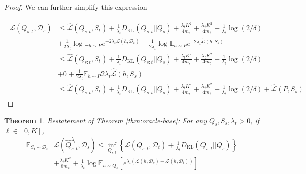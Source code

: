 \documentclass{article}
\theoremstyle{plain}
\newtheorem{theorem}{Theorem}[section]
\theoremstyle{definition}
\theoremstyle{remark}
\begin{document}
\begin{proof}
We can further simplify this expression 

\begin{align*}
\begin{split}
\mathcal{L}(Q_{s:t}, \mathcal{D}_s) &\leq \hat{\mathcal{L}}(Q_{s:t}, S_t)+ \frac{1}{\lambda_t} D_{\mathrm{KL}}(Q_{s:t}||Q_{s})
+\frac{\lambda_t K^2}{4m_s}+\frac{\lambda_t K^2}{4m_t}+\frac{1}{\lambda_t}\log(2/\delta)\\&+\frac{1}{2\lambda_t}\log\mathbb{E}_{h\sim P} e^{-2\lambda_t\mathcal{L}(h,\mathcal{D}_t)}-\frac{1}{2\lambda_t}\log\mathbb{E}_{h\sim P} e^{-2\lambda_t\hat{\mathcal{L}}(h,S_s)}   \\
& \leq \hat{\mathcal{L}}(Q_{s:t}, S_t)+ \frac{1}{\lambda_t} D_{\mathrm{KL}}(Q_{s:t}||Q_{s})
+\frac{\lambda_t K^2}{4m_s}+\frac{\lambda_t K^2}{4m_t}+\frac{1}{\lambda_t}\log(2/\delta)\\&+0+\frac{1}{2\lambda_t}\mathbb{E}_{h\sim P} 2\lambda_t\hat{\mathcal{L}}(h,S_s) \\
& \leq \hat{\mathcal{L}}(Q_{s:t}, S_t) + \frac{1}{\lambda_t} D_{\mathrm{KL}}(Q_{s:t}||Q_{s})
+\frac{\lambda_t K^2}{4m_s}+\frac{\lambda_t K^2}{4m_t}+\frac{1}{\lambda_t}\log(2/\delta)+ \hat{\mathcal{L}}(P, S_s)
\end{split}
\end{align*}

\end{proof}



\begin{theorem} Restatement of Theorem \ref{thm:oracle-base}:
For any $Q_s, S_s, \lambda_t>0$, if $\ell\in [0,K]$, 
\begin{equation} 
\begin{split}
\mathbb{E}_{S_t\sim \mathcal{D}_t}&\mathcal{L}( \hat{Q}^{\lambda_t}_{s:t},\mathcal{D}_s)\leq\inf_{Q_{s:t}}\left \{ \mathcal{L}(Q_{s:t},\mathcal{D}_t) + \frac{1}{\lambda_t}D_{\mathrm{KL}}(Q_{s:t}||Q_{s}) \right \} \\
&+\frac{\lambda_t K^2}{8m_t}+\frac{1}{\lambda_t}\log\mathbb{E}_{h\sim Q_s}\left [e^{\lambda_t(\mathcal{L}(h,\mathcal{D}_s)-\mathcal{L}(h,\mathcal{D}_t))} \right ]
\end{split}
\end{equation}
\end{theorem}
\end{document}
